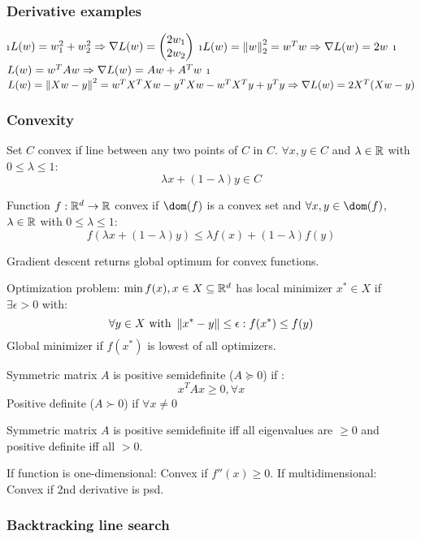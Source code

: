 \subsubsection{Derivative examples}

\bi
\i $L(w) = w_1^2 + w_2^2 \\\Rightarrow \nabla L(w) = \begin{pmatrix} 2w_1\\2w_2 \end{pmatrix}$
\i $L(w) = \left\lVert w\right\rVert ^2_2 = w^Tw \\\Rightarrow \nabla L(w) = 2w$
\i $L(w) = w^TAw \\\Rightarrow \nabla L(w) = Aw + A^Tw$
\i $L(w) = \left\lVert Xw-y\right\rVert^2 = w^TX^TXw - y^TXw - w^TX^Ty + y^Ty \\\Rightarrow \nabla L(w) = 2X^T(Xw - y)$
\ei

\subsubsection{Convexity}

Set $C$ convex if line between any two points of $C$ in $C$. $\forall x,y \in C$ and $\lambda \in \mathbb{R}$ with $0 \leq \lambda \leq 1$: \[\lambda x + (1 - \lambda) y \in C\]

Function $f: \mathbb{R}^d \to \mathbb{R}$ convex if $\dom(f)$ is a convex set and $\forall x,y \in \dom(f)$, $\lambda \in \mathbb{R}$ with $0 \leq \lambda \leq 1$: \[f(\lambda x + (1 - \lambda) y) \leq \lambda f(x) + (1 - \lambda) f(y)\]

Gradient descent returns global optimum for convex functions.

Optimization problem: $\min f(x), x \in X \subseteq \mathbb{R}^d$ has local minimizer $x^* \in X$ if $\exists \epsilon > 0$ with:
\[\forall y \in X \text{ with } \left\lVert x^* - y\right\rVert \leq \epsilon: f(x^*) \leq f(y)\]
Global minimizer if $f(x^*)$ is lowest of all optimizers.

Symmetric matrix $A$ is positive semidefinite ($A \succcurlyeq 0$) if :
\[x^TAx \geq 0, \forall x\]
Positive definite ($A \succ 0$) if $\forall x \neq 0$

Symmetric matrix $A$ is positive semidefinite iff all eigenvalues are $\geq 0$ and positive definite iff all $> 0$.

If function is one-dimensional: Convex if $f''(x) \geq 0$.
If multidimensional: Convex if 2nd derivative is psd.


\subsubsection{Backtracking line search} %

